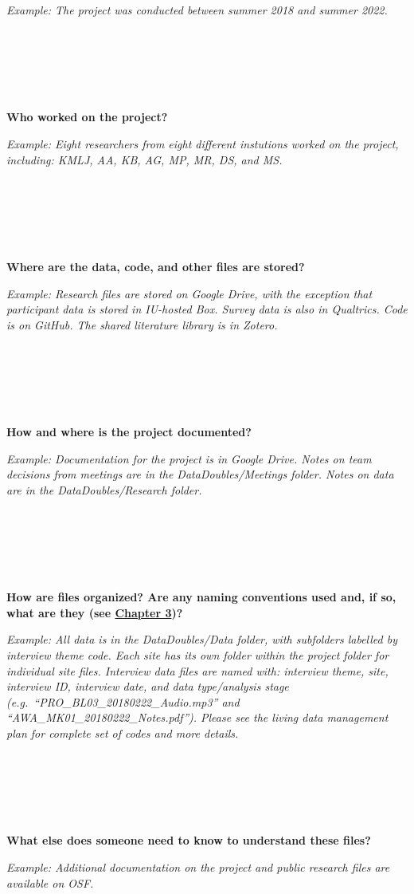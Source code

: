 \documentclass[
]{book}
\begin{document}
\emph{Example: The project was conducted between summer 2018 and summer 2022.}

~

~

~

\textbf{Who worked on the project?}

\emph{Example: Eight researchers from eight different instutions worked on the project, including: KMLJ, AA, KB, AG, MP, MR, DS, and MS.}

~

~

~

\textbf{Where are the data, code, and other files are stored?}

\emph{Example: Research files are stored on Google Drive, with the exception that participant data is stored in IU-hosted Box. Survey data is also in Qualtrics. Code is on GitHub. The shared literature library is in Zotero.}

~

~

~

\textbf{How and where is the project documented?}

\emph{Example: Documentation for the project is in Google Drive. Notes on team decisions from meetings are in the DataDoubles/Meetings folder. Notes on data are in the DataDoubles/Research folder.}

~

~

~

\textbf{How are files organized? Are any naming conventions used and, if so, what are they (see \protect\hyperlink{file-organization-and-naming}{Chapter 3})?}

\emph{Example: All data is in the DataDoubles/Data folder, with subfolders labelled by interview theme code. Each site has its own folder within the project folder for individual site files. Interview data files are named with: interview theme, site, interview ID, interview date, and data type/analysis stage (e.g.~``PRO\_BL03\_20180222\_Audio.mp3'' and ``AWA\_MK01\_20180222\_Notes.pdf''). Please see the living data management plan for complete set of codes and more details.}

~

~

~

\textbf{What else does someone need to know to understand these files?}

\emph{Example: Additional documentation on the project and public research files are available on OSF.}
\end{document}
